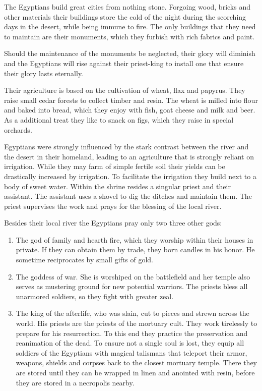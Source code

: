 \documentclass[a4paper]{book}
\begin{document}
	The \gls{Egyptians} build great cities from nothing stone.
	Forgoing wood, bricks and other materials their buildings store the cold
	of the night during the scorching days in the desert,
	while being immune to fire.
	The only buildings that they need to maintain are their monuments,
	which they furbish with rich fabrics and paint.

	Should the maintenance of the monuments be neglected,
	their glory will diminish and the \gls{Egyptians} will rise against their
	priest-king to install one that ensure their glory lasts eternally.

	Their agriculture is based on the cultivation of wheat, flax and papyrus.
	They raise small cedar forests to collect timber and resin.
	The wheat is milled into flour and baked into bread,
		which they enjoy with fish, goat cheese and milk and beer.
	As a additional treat they like to snack on figs,
	which they raise in special orchards.

	\Gls{Egyptians} were strongly influenced by the stark contrast between
	the river and the desert in their homeland,
	leading to an agriculture that is strongly reliant on irrigation.
	While they may farm of simple fertile soil their yields can be drastically 
	increased by irrigation.
	To facilitate the irrigation they build  next to a body of sweet water.
	Within the shrine resides a singular priest and their assistant.
	The assistant uses a shovel to dig the ditches and maintain them.
	The priest supervises the work and prays for the blessing of the local river.

	Besides their local river the \gls{Egyptians} pray only two three other gods:

	\begin{enumerate}
		\item The god of family and hearth fire, which they worship within their houses in private.
			If they can obtain them by trade, they born candles in his honor.
			He sometime reciprocates by small gifts of gold.
		\item The goddess of war. She is worshiped on the battlefield and her temple
			also serves as mustering ground for new potential warriors.
			The priests bless all unarmored soldiers, so they fight with greater zeal.
		\item The king of the afterlife, who was slain, cut to pieces and strewn across the world.
			His priests are the priests of the mortuary cult.
			They work tirelessly to prepare for his resurrection.
			To this end they practice the preservation and reanimation of the dead.
			To ensure not a single soul is lost,
			they equip all soldiers of the \gls{Egyptians} with magical talismans
			that teleport their armor, weapons, shields and corpses back to the closest mortuary temple.
			There they are stored until they can be wrapped in linen and anointed with resin,
			before they are stored in a necropolis nearby.
	\end{enumerate}
\end{document}
